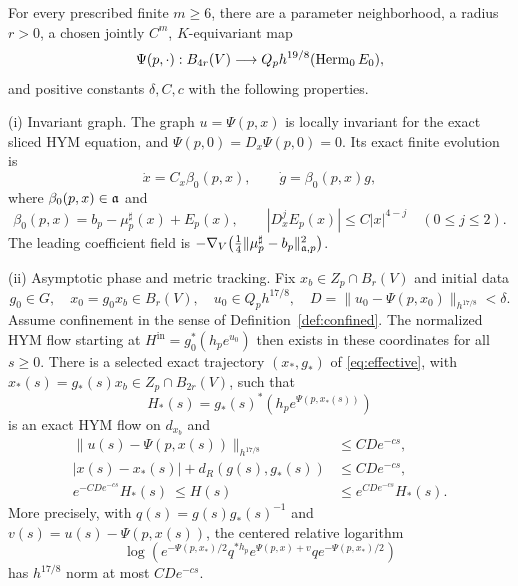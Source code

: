 \begin{theorem}\label{thm:main}
For every prescribed finite $m\ge6$, there are a parameter neighborhood,
a radius $r>0$, a chosen jointly $C^m$, $K$-equivariant map
\[
 \Psi(p,\cdot):B_{4r}(V)\longrightarrow Q_p h^{19/8}(\operatorname{Herm}_0E_0),
\]
and positive constants $\delta,C,c$ with the following properties.

\smallskip\noindent
\textup{(i) Invariant graph.} The graph $u=\Psi(p,x)$ is locally invariant for the
exact sliced HYM equation, and
$\Psi(p,0)=D_x\Psi(p,0)=0$. Its exact finite evolution is
\begin{equation}\label{eq:effective}
 \dot x=C_x\beta_0(p,x),\qquad
 \dot g=\beta_0(p,x)g,
\end{equation}
where $\beta_0(p,x)\in\mathfrak a$ and
\begin{equation}\label{eq:effective-expansion}
 \beta_0(p,x)=b_p-\mu_p^\sharp(x)+E_p(x),\qquad
 |D_x^jE_p(x)|\le C|x|^{4-j}\quad(0\le j\le2).
\end{equation}
The leading coefficient field is
$-\nabla_V\bigl(\frac14\|\mu_p^\sharp-b_p\|_{\mathfrak a,p}^2\bigr)$.

\smallskip\noindent
\textup{(ii) Asymptotic phase and metric tracking.}
Fix $x_b\in Z_p\cap B_r(V)$ and initial data
\[
 g_0\in G,\quad x_0=g_0x_b\in B_r(V),\quad
 u_0\in Q_p h^{17/8},\quad
 D=\|u_0-\Psi(p,x_0)\|_{h^{17/8}}<\delta.
\]
Assume confinement in the sense of Definition~\ref{def:confined}.
The normalized HYM flow starting at $H^{\mathrm{in}}=g_0^*(h_pe^{u_0})$
then exists in these coordinates for all $s\ge0$. There is a selected
exact trajectory $(x_*,g_*)$ of \eqref{eq:effective}, with
$x_*(s)=g_*(s)x_b\in Z_p\cap B_{2r}(V)$, such that
\[
 H_*(s)=g_*(s)^*(h_pe^{\Psi(p,x_*(s))})
\]
is an exact HYM flow on $d_{x_b}$ and
\begin{align}
 \|u(s)-\Psi(p,x(s))\|_{h^{17/8}}&\le CD e^{-cs},\label{eq:normal-main}\\
 |x(s)-x_*(s)|+d_R(g(s),g_*(s))&\le CD e^{-cs},\label{eq:lift-main}\\
 e^{-CD e^{-cs}}H_*(s)\ \le H(s)&\le e^{CD e^{-cs}}H_*(s).
                                                        \label{eq:order-main}
\end{align}
More precisely, with $q(s)=g(s)g_*(s)^{-1}$ and
$v(s)=u(s)-\Psi(p,x(s))$, the centered relative logarithm
\begin{equation}\label{eq:relative-log}
 \log\!\left(
 e^{-\Psi(p,x_*)/2}q^{*h_p}e^{\Psi(p,x)+v}q
 e^{-\Psi(p,x_*)/2}\right)
\end{equation}
has $h^{17/8}$ norm at most $CD e^{-cs}$.


\end{theorem}
